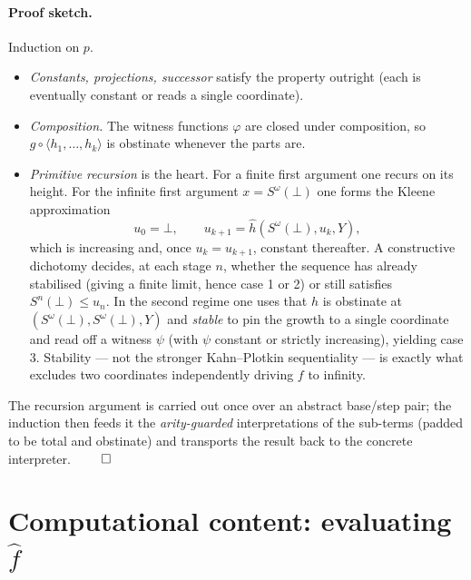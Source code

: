 \documentclass[11pt]{article}
\newcommand{\Sw}{S^{\omega}(\bot)}
\newcommand{\hatf}{\hat f}
\begin{document}
\paragraph{Proof sketch.} Induction on $p$.
\begin{itemize}
\item \emph{Constants, projections, successor} satisfy the property outright
      (each is eventually constant or reads a single coordinate).
\item \emph{Composition.} The witness functions $\varphi$ are closed under
      composition, so $g\circ\langle h_1,\dots,h_k\rangle$ is obstinate whenever
      the parts are.
\item \emph{Primitive recursion} is the heart. For a finite first argument one
      recurs on its height. For the infinite first argument $x=\Sw$ one forms
      the Kleene approximation
      \[
        u_0=\bot,\qquad u_{k+1}=\hat h(\Sw,u_k,Y),
      \]
      which is increasing and, once $u_k=u_{k+1}$, constant thereafter. A
      constructive dichotomy decides, at each stage $n$, whether the sequence
      has already stabilised (giving a finite limit, hence case 1 or 2) or
      still satisfies $S^n(\bot)\le u_n$. In the second regime one uses that
      $h$ is obstinate at $(\Sw,\Sw,Y)$ and \emph{stable} to pin the growth to
      a single coordinate and read off a witness $\psi$ (with $\psi$ constant
      or strictly increasing), yielding case 3. Stability --- not the stronger
      Kahn--Plotkin sequentiality --- is exactly what excludes two coordinates
      independently driving $f$ to infinity.
\end{itemize}
The recursion argument is carried out once over an abstract base/step pair; the
induction then feeds it the \emph{arity-guarded} interpretations of the
sub-terms (padded to be total and obstinate) and transports the result back to
the concrete interpreter. $\qed$

\section{Computational content: evaluating $\hatf$}
\end{document}
